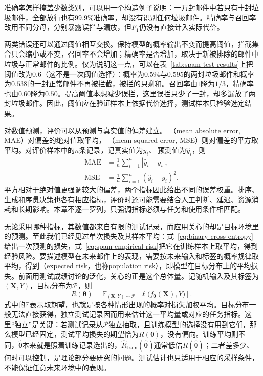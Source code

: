 准确率怎样掩盖少数类别，可以用一个构造例子说明：一万封邮件中若只有十封垃圾邮件，全部放行也有$99.9\%$准确率，却没有识别任何垃圾邮件。精确率与召回率改用不同分母，分别暴露误拦与漏放，但$F_1$仍没有直接计入实际代价。

两类错误还可以通过阈值相互交换。保持模型的概率输出不变而提高阈值，拦截集合只会缩小或不变，召回率不会增加；精确率是否增加，取决于新被排除的邮件中垃圾与正常邮件的比例。仅为说明这一点，可以在表~\ref{tab:spam-test-results}上把阈值改为$0.6$（这不是一次阈值选择）：概率为$0.594$与$0.595$的两封垃圾邮件和概率为$0.538$的一封正常邮件不再被拦截，被拦的只剩和。召回率由$1$降为$1/3$，精确率也由$0.60$降为$0.50$。提高阈值本想减少误拦，这里误拦只少了一封，却多漏放了两封垃圾邮件。因此，阈值应在验证样本上依据代价选择，测试样本只检验选定结果。

对数值预测，评价可以从预测与真实值的偏差建立。
（mean absolute error, MAE）对偏差的绝对值取平均，
（mean squared error, MSE）则对偏差的平方取平均。对评价样本中的$n$条记录，记真实值为$y_i$、
预测值为$\hat{y}_i$，则
\begin{align}
  \operatorname{MAE}
    &=\frac{1}{n}\sum_{i=1}^{n}|\hat{y}_i-y_i|,\\
  \operatorname{MSE}
    &=\frac{1}{n}\sum_{i=1}^{n}(\hat{y}_i-y_i)^2.
\end{align}
平方相对于绝对值更强调较大的偏差，两个指标因此给出不同的误差权重。排序、生成和序贯决策也各有相应指标，评价时还可能需要结合人工判断、延迟、资源消耗和长期影响。本章不逐一罗列，只强调指标必须与任务和使用条件相匹配。

无论采用哪种指标，其数值都来自有限的测试记录，而应用关心的却是目标环境里的预测。至此我们已经见过单次损失及其样本平均：式~\eqref{eq:binary-cross-entropy}给出一次预测的损失，式~\eqref{eq:spam-empirical-risk}把它在训练样本上取平均，得到经验风险。要描述模型在未来邮件上的表现，需要按未来输入和标签的概率规律取平均，得到（expected risk，也称population risk），即模型在目标分布上的平均损失。前面用测试成绩讨论的泛化，关心的正是这个总体量。记随机输入及其标签为$(\bm{X},Y)$，目标分布为$\mathcal{P}$，则
\begin{equation}
  R(\bm{\theta})
  =\mathbb{E}_{(\bm{X},Y)\sim\mathcal{P}}
  \left[\ell\bigl(f_{\bm{\theta}}(\bm{X}),Y\bigr)\right].
  \label{eq:expected-risk}
\end{equation}
式中的$\mathbb{E}$表示取期望，也就是按各种情形出现的概率对损失加权平均。目标分布一般无法直接获得，独立测试记录因而用来估计这一平均量或对应的任务指标。这里“独立”是关键：若测试记录从$\mathcal{P}$独立抽取，且训练模型的选择没有用到它们，那么模型已经固定，测试平均损失的期望恰为$R(\bm{\theta})$，没有偏向。训练平均则不同，$\hat{\bm{\theta}}$本来就是照着训练记录选出的，$\hat{R}_{\mathrm{train}}(\hat{\bm{\theta}})$通常低估$R(\hat{\bm{\theta}})$；二者差多少、何时可以控制，是理论部分要研究的问题。测试估计也只适用于相应的采样条件，不能保证任意未来环境中的表现。


